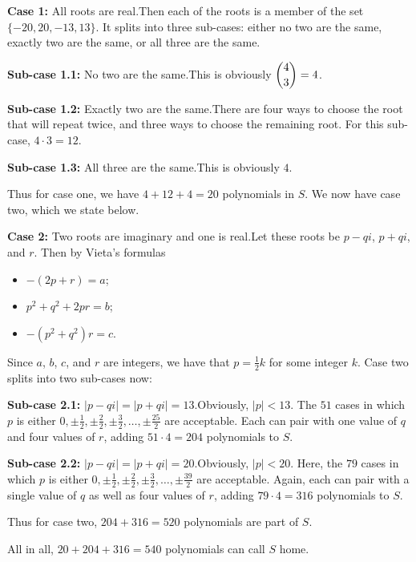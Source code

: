 \begin{enumerate}
 \textbf{Case 1:} All roots are real.Then each of the roots is a member of the set $\{-20, 20, -13, 13\}$. It splits into three sub-cases: either no two are the same, exactly two are the same, or all three are the same.

 \textbf{Sub-case 1.1:} No two are the same.This is obviously $\dbinom{4}{3}=4$.

 \textbf{Sub-case 1.2:} Exactly two are the same.There are four ways to choose the root that will repeat twice, and three ways to choose the remaining root. For this sub-case, $4\cdot 3=12$.

 \textbf{Sub-case 1.3:} All three are the same.This is obviously $4$.

 Thus for case one, we have $4+12+4=20$ polynomials in $S$. We now have case two, which we state below.

 \textbf{Case 2:} Two roots are imaginary and one is real.Let these roots be $p-qi$, $p+qi$, and $r$. Then by Vieta's formulas

 
            \begin{itemize}
        \item $-(2p+r)=a$;
        \item $p^{2}+q^{2}+2pr=b$;
        \item $-\left(p^{2}+q^{2}\right)r=c$.
            \end{itemize}
            Since $a$, $b$, $c$, and $r$ are integers, we have that $p=\frac{1}{2}k$ for some integer $k$. Case two splits into two sub-cases now:

 \textbf{Sub-case 2.1:} $|p-qi|=|p+qi|=13$.Obviously, $|p|<13$. The $51$ cases in which $p$ is either $0,\pm\frac{1}{2},\pm\frac{2}{2},\pm\frac{3}{2},\ldots,\pm\frac{25}{2}$ are acceptable. Each can pair with one value of $q$ and four values of $r$, adding $51\cdot 4=204$ polynomials to $S$.

 \textbf{Sub-case 2.2:} $|p-qi|=|p+qi|=20$.Obviously, $|p|<20$. Here, the $79$ cases in which $p$ is either $0,\pm\frac{1}{2},\pm\frac{2}{2},\pm\frac{3}{2},\ldots,\pm\frac{39}{2}$ are acceptable. Again, each can pair with a single value of $q$ as well as four values of $r$, adding $79\cdot 4=316$ polynomials to $S$.

 Thus for case two, $204+316=520$ polynomials are part of $S$.

 All in all, $20+204+316=\boxed{540}$ polynomials can call $S$ home.

 


 



\end{enumerate}
